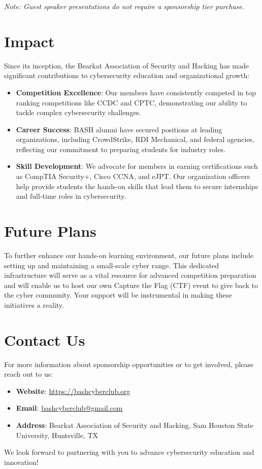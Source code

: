 \documentclass[11pt,letterpaper]{article}
\begin{document}
\textit{Note: Guest speaker presentations do not require a sponsorship tier purchase.}

\section*{Impact}
Since its inception, the Bearkat Association of Security and Hacking has made significant contributions to cybersecurity education and organizational growth:
\begin{itemize}
    \item \textbf{Competition Excellence}: Our members have consistently competed in top ranking competitions like CCDC and CPTC, demonstrating our ability to tackle complex cybersecurity challenges.
    \item \textbf{Career Success}: BASH alumni have secured positions at leading organizations, including CrowdStrike, RDI Mechanical, and federal agencies, reflecting our commitment to preparing students for industry roles.
    \item \textbf{Skill Development}: We advocate for members in earning certifications such as CompTIA Security+, Cisco CCNA, and eJPT. Our organization officers help provide students the hands-on skills that lead them to secure internships and full-time roles in cybersecurity.
\end{itemize}

\section*{Future Plans}
To further enhance our hands-on learning environment, our future plans include setting up and maintaining a small-scale cyber range. This dedicated infrastructure will serve as a vital resource for advanced competition preparation and will enable us to host our own Capture the Flag (CTF) event to give back to the cyber community. Your support will be instrumental in making these initiatives a reality.

\section*{Contact Us}
For more information about sponsorship opportunities or to get involved, please reach out to us:
\begin{itemize}
    \item \textbf{Website}: \url{https://bashcyberclub.org}
    \item \textbf{Email}: \href{mailto:bashcyberclub@gmail.com}{bashcyberclub@gmail.com}
    \item \textbf{Address}: Bearkat Association of Security and Hacking, Sam Houston State University, Huntsville, TX
\end{itemize}

We look forward to partnering with you to advance cybersecurity education and innovation!
\end{document}
